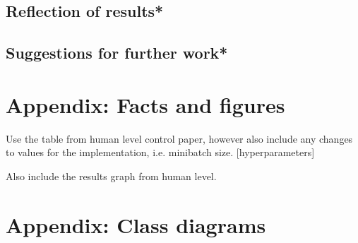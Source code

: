 \documentclass[10pt]{article}
\begin{document}
	\subsection{Reflection of results*}

	\medskip

	\subsection{Suggestions for further work*}

\newpage
\printbibliography[
	    heading=bibintoc,
        title={References}
    ]
\newpage
\appendix

\section{Appendix: Facts and figures}
	Use the table from human level control paper, however also include any changes to values for the implementation, i.e. minibatch size. [hyperparameters]
	
	Also include the results graph from human level.

\section{Appendix: Class diagrams}
\end{document}
